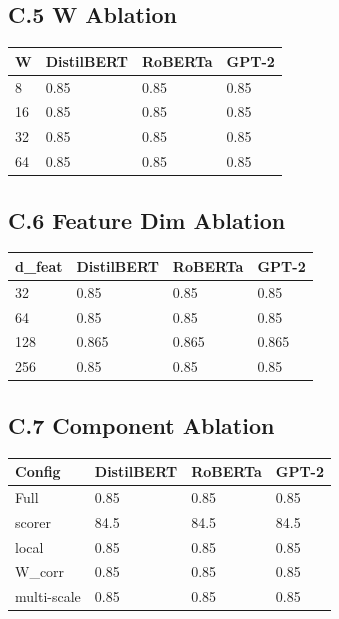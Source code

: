 \subsection{C.5 W Ablation}

\begin{table}[H]
\centering
\small
\begin{tabular}{llll}
\toprule
\textbf{W} & \textbf{DistilBERT} & \textbf{RoBERTa} & \textbf{GPT-2} \\
\midrule
8 & 0.85 & 0.85 & 0.85 \\
16 & 0.85 & 0.85 & 0.85 \\
32 & 0.85 & 0.85 & 0.85 \\
64 & 0.85 & 0.85 & 0.85 \\
\bottomrule
\end{tabular}
\end{table}

\subsection{C.6 Feature Dim Ablation}

\begin{table}[H]
\centering
\small
\begin{tabular}{llll}
\toprule
\textbf{d\_feat} & \textbf{DistilBERT} & \textbf{RoBERTa} & \textbf{GPT-2} \\
\midrule
32 & 0.85 & 0.85 & 0.85 \\
64 & 0.85 & 0.85 & 0.85 \\
128 & 0.865 & 0.865 & 0.865 \\
256 & 0.85 & 0.85 & 0.85 \\
\bottomrule
\end{tabular}
\end{table}

\subsection{C.7 Component Ablation}

\begin{table}[H]
\centering
\small
\begin{tabular}{llll}
\toprule
\textbf{Config} & \textbf{DistilBERT} & \textbf{RoBERTa} & \textbf{GPT-2} \\
\midrule
Full & 0.85 & 0.85 & 0.85 \\
scorer & 84.5 & 84.5 & 84.5 \\
local & 0.85 & 0.85 & 0.85 \\
W\_corr & 0.85 & 0.85 & 0.85 \\
multi-scale & 0.85 & 0.85 & 0.85 \\
\bottomrule
\end{tabular}
\end{table}

